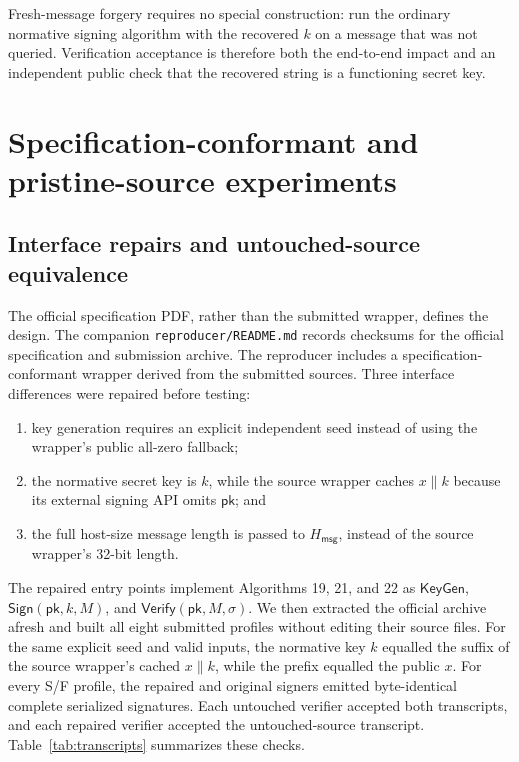 \documentclass[11pt,a4paper]{article}
\newcommand{\Sign}{\mathsf{Sign}}
\newcommand{\Verify}{\mathsf{Verify}}
\newcommand{\KeyGen}{\mathsf{KeyGen}}
\newcommand{\pk}{\mathsf{pk}}
\newcommand{\Hmsg}{H_{\mathsf{msg}}}
\begin{document}
Fresh-message forgery requires no special construction: run the ordinary
normative signing algorithm with the recovered $k$ on a message that was not
queried.  Verification acceptance is therefore both the end-to-end impact and an
independent public check that the recovered string is a functioning secret key.

\section{Specification-conformant and pristine-source experiments}

\subsection{Interface repairs and untouched-source equivalence}

The official specification PDF, rather than the submitted wrapper, defines the
design.  The companion \texttt{reproducer/README.md} records checksums for the
official specification and submission archive.  The reproducer includes a
specification-conformant
wrapper derived from the submitted sources.  Three interface differences were
repaired before testing:
\begin{enumerate}[leftmargin=*,itemsep=2pt]
  \item key generation requires an explicit independent seed instead of using
        the wrapper's public all-zero fallback;
  \item the normative secret key is $k$, while the source wrapper caches
        $x\mathbin\|k$ because its external signing API omits $\pk$; and
  \item the full host-size message length is passed to $\Hmsg$, instead of the
        source wrapper's 32-bit length.
\end{enumerate}
The repaired entry points implement Algorithms 19, 21, and 22 as
$\KeyGen$, $\Sign(\pk,k,M)$, and $\Verify(\pk,M,\sigma)$.  We then extracted the
official archive afresh and built all eight submitted profiles without
editing their source files.  For the same explicit seed and valid inputs, the
normative key $k$ equalled the suffix of the source wrapper's cached
$x\mathbin\|k$, while the prefix equalled the public $x$.  For every S/F profile,
the repaired and original signers emitted byte-identical complete serialized
signatures.  Each untouched verifier accepted both transcripts, and each repaired
verifier accepted the untouched-source transcript.  Table~\ref{tab:transcripts}
summarizes these checks.
\end{document}
